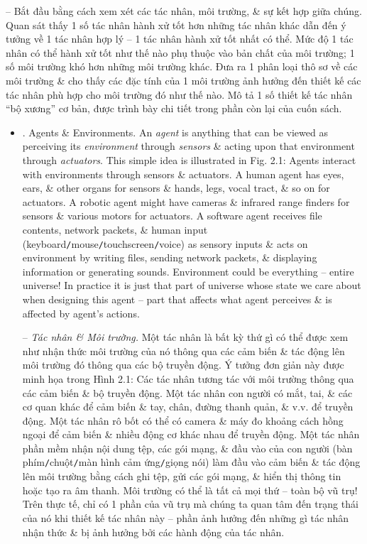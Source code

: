 \documentclass{article}
\begin{document}
\begin{itemize}
\begin{itemize}
		-- Bắt đầu bằng cách xem xét các tác nhân, môi trường, \& sự kết hợp giữa chúng. Quan sát thấy 1 số tác nhân hành xử tốt hơn những tác nhân khác dẫn đến ý tưởng về 1 tác nhân hợp lý -- 1 tác nhân hành xử tốt nhất có thể. Mức độ 1 tác nhân có thể hành xử tốt như thế nào phụ thuộc vào bản chất của môi trường; 1 số môi trường khó hơn những môi trường khác. Đưa ra 1 phân loại thô sơ về các môi trường \& cho thấy các đặc tính của 1 môi trường ảnh hưởng đến thiết kế các tác nhân phù hợp cho môi trường đó như thế nào. Mô tả 1 số thiết kế tác nhân ``bộ xương'' cơ bản, được trình bày chi tiết trong phần còn lại của cuốn sách.
		\begin{itemize}
			\item {. Agents \& Environments.} An {\it agent} is anything that can be viewed as perceiving its {\it environment} through {\it sensors} \& acting upon that environment through {\it actuators}. This simple idea is illustrated in {\sf Fig. 2.1: Agents interact with environments through sensors \& actuators}. A human agent has eyes, ears, \& other organs for sensors \& hands, legs, vocal tract, \& so on for actuators. A robotic agent might have cameras \& infrared range finders for sensors \& various motors for actuators. A software agent receives file contents, network packets, \& human input (keyboard{\tt/}mouse{\tt/}touchscreen{\tt/}voice) as sensory inputs \& acts on environment by writing files, sending network packets, \& displaying information or generating sounds. Environment could be everything -- entire universe! In practice it is just that part of universe whose state we care about when designing this agent -- part that affects what agent perceives \& is affected by agent's actions.
			
			-- {\it Tác nhân \& Môi trường.} Một tác nhân là bất kỳ thứ gì có thể được xem như nhận thức môi trường của nó thông qua các cảm biến \& tác động lên môi trường đó thông qua các bộ truyền động. Ý tưởng đơn giản này được minh họa trong {\sf Hình 2.1: Các tác nhân tương tác với môi trường thông qua các cảm biến \& bộ truyền động}. Một tác nhân con người có mắt, tai, \& các cơ quan khác để cảm biến \& tay, chân, đường thanh quản, \& v.v. để truyền động. Một tác nhân rô bốt có thể có camera \& máy đo khoảng cách hồng ngoại để cảm biến \& nhiều động cơ khác nhau để truyền động. Một tác nhân phần mềm nhận nội dung tệp, các gói mạng, \& đầu vào của con người (bàn phím{\tt/}chuột{\tt/}màn hình cảm ứng{\tt/}giọng nói) làm đầu vào cảm biến \& tác động lên môi trường bằng cách ghi tệp, gửi các gói mạng, \& hiển thị thông tin hoặc tạo ra âm thanh. Môi trường có thể là tất cả mọi thứ -- toàn bộ vũ trụ! Trên thực tế, chỉ có 1 phần của vũ trụ mà chúng ta quan tâm đến trạng thái của nó khi thiết kế tác nhân này -- phần ảnh hưởng đến những gì tác nhân nhận thức \& bị ảnh hưởng bởi các hành động của tác nhân.
			

\end{itemize}
\end{itemize}
\end{itemize}
\end{document}
